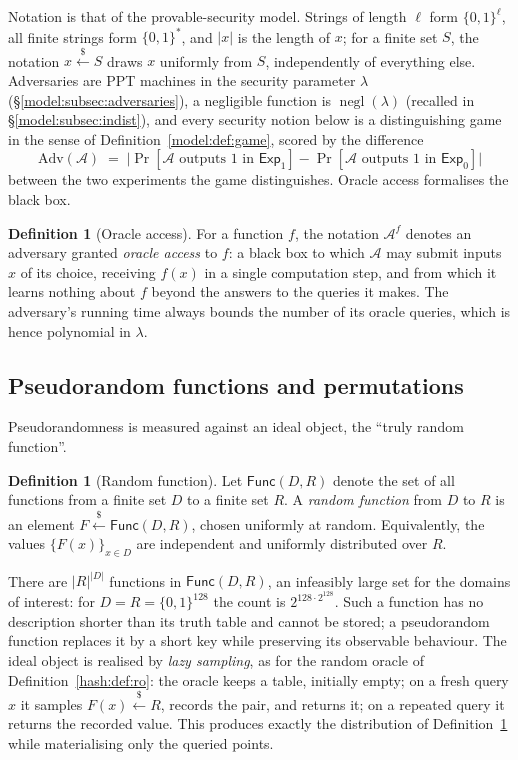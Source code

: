 \documentclass[11pt,a4paper]{article}
\theoremstyle{definition}
\newtheorem{definition}[theorem]{Definition}
\theoremstyle{remark}
\DeclareMathOperator{\negl}{negl}
\providecommand{\abs}[1]{\lvert #1 \rvert}
\begin{document}
Notation is that of the provable-security model. Strings of length
\(\ell\) form \(\{0,1\}^{\ell}\), all finite strings form
\(\{0,1\}^{*}\), and \(\abs{x}\) is the length of \(x\); for a finite
set \(S\), the notation \(x \xleftarrow{\$} S\) draws \(x\) uniformly
from \(S\), independently of everything else. Adversaries are PPT
machines in the security parameter \(\lambda\)
(\S\ref{model:subsec:adversaries}), a negligible function is
\(\negl(\lambda)\) (recalled in \S\ref{model:subsec:indist}), and
every security notion below is a distinguishing game in the sense of
Definition~\ref{model:def:game}, scored by the difference
\[
\mathrm{Adv}(\mathcal{A})
\;=\;
\bigl|\Pr[\mathcal{A}\text{ outputs }1\text{ in }\mathsf{Exp}_{1}]
     -\Pr[\mathcal{A}\text{ outputs }1\text{ in }\mathsf{Exp}_{0}]\bigr|
\]
between the two experiments the game distinguishes. Oracle access
formalises the black box.

\begin{definition}[Oracle access]\label{prf:def:oracle}
For a function \(f\), the notation \(\mathcal{A}^{f}\) denotes an
adversary granted \emph{oracle access} to \(f\): a black box to which
\(\mathcal{A}\) may submit inputs \(x\) of its choice, receiving
\(f(x)\) in a single computation step, and from which it learns
nothing about \(f\) beyond the answers to the queries it makes. The
adversary's running time always bounds the number of its oracle
queries, which is hence polynomial in \(\lambda\).
\end{definition}

\subsection{Pseudorandom functions and permutations}
\label{prf:subsec:prf}

Pseudorandomness is measured against an ideal object, the ``truly
random function''.

\begin{definition}[Random function]\label{prf:def:randfun}
Let \(\mathsf{Func}(D, R)\) denote the set of all functions from a
finite set \(D\) to a finite set \(R\). A \emph{random function} from
\(D\) to \(R\) is an element \(F \xleftarrow{\$} \mathsf{Func}(D, R)\),
chosen uniformly at random. Equivalently, the values
\(\{F(x)\}_{x \in D}\) are independent and uniformly distributed over
\(R\).
\end{definition}

There are \(\abs{R}^{\abs{D}}\) functions in \(\mathsf{Func}(D, R)\),
an infeasibly large set for the domains of interest: for
\(D = R = \{0,1\}^{128}\) the count is \(2^{128 \cdot 2^{128}}\).
Such a function has no description shorter than its truth table and
cannot be stored; a pseudorandom function replaces it by a short key
while preserving its observable behaviour. The ideal object is
realised by \emph{lazy sampling}, as for the random oracle of
Definition~\ref{hash:def:ro}: the oracle keeps a table, initially
empty; on a fresh query \(x\) it samples
\(F(x) \xleftarrow{\$} R\), records the pair, and returns it; on a
repeated query it returns the recorded value. This produces exactly
the distribution of Definition~\ref{prf:def:randfun} while materialising
only the queried points.
\end{document}
